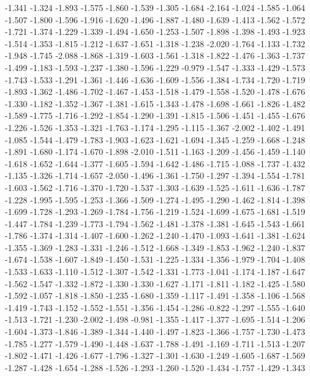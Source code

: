 \documentclass[9pt]{article}
\theoremstyle{plain}
\theoremstyle{definition}
\theoremstyle{remark}
\numberwithin{equation}{section}
\begin{document}
-1.341
-1.324
-1.893
-1.575
-1.860
-1.539
-1.305
-1.684
-2.164
-1.024
-1.585
-1.064
-1.507
-1.800
-1.596
-1.916
-1.620
-1.496
-1.887
-1.480
-1.639
-1.413
-1.562
-1.572
-1.721
-1.374
-1.229
-1.339
-1.494
-1.650
-1.253
-1.507
-1.898
-1.398
-1.493
-1.923
-1.514
-1.353
-1.815
-1.212
-1.637
-1.651
-1.318
-1.238
-2.020
-1.764
-1.133
-1.732
-1.948
-1.745
-2.088
-1.868
-1.319
-1.603
-1.561
-1.318
-1.822
-1.476
-1.363
-1.737
-1.499
-1.183
-1.593
-1.237
-1.380
-1.596
-1.229
-0.979
-1.547
-1.333
-1.429
-1.573
-1.743
-1.533
-1.291
-1.361
-1.446
-1.636
-1.609
-1.556
-1.384
-1.734
-1.720
-1.719
-1.893
-1.362
-1.486
-1.702
-1.467
-1.453
-1.518
-1.479
-1.558
-1.520
-1.478
-1.676
-1.330
-1.182
-1.352
-1.367
-1.381
-1.615
-1.343
-1.478
-1.698
-1.661
-1.826
-1.482
-1.589
-1.775
-1.716
-1.292
-1.854
-1.290
-1.391
-1.815
-1.506
-1.451
-1.455
-1.676
-1.226
-1.526
-1.353
-1.321
-1.763
-1.174
-1.295
-1.115
-1.367
-2.002
-1.402
-1.491
-1.085
-1.544
-1.479
-1.783
-1.903
-1.623
-1.621
-1.694
-1.345
-1.259
-1.668
-1.248
-1.891
-1.680
-1.174
-1.670
-1.898
-2.010
-1.511
-1.163
-1.209
-1.456
-1.459
-1.140
-1.618
-1.652
-1.644
-1.377
-1.605
-1.594
-1.642
-1.486
-1.715
-1.088
-1.737
-1.432
-1.135
-1.326
-1.714
-1.657
-2.050
-1.496
-1.361
-1.750
-1.297
-1.394
-1.554
-1.781
-1.603
-1.562
-1.716
-1.370
-1.720
-1.537
-1.303
-1.639
-1.525
-1.611
-1.636
-1.787
-1.228
-1.995
-1.595
-1.253
-1.366
-1.509
-1.274
-1.495
-1.290
-1.462
-1.814
-1.398
-1.699
-1.728
-1.293
-1.269
-1.784
-1.756
-1.219
-1.524
-1.699
-1.675
-1.681
-1.519
-1.447
-1.784
-1.239
-1.773
-1.794
-1.562
-1.481
-1.378
-1.381
-1.645
-1.543
-1.661
-1.786
-1.374
-1.314
-1.407
-1.600
-1.262
-1.240
-1.470
-1.093
-1.641
-1.381
-1.624
-1.355
-1.369
-1.283
-1.331
-1.246
-1.512
-1.668
-1.349
-1.853
-1.962
-1.240
-1.837
-1.674
-1.538
-1.607
-1.849
-1.450
-1.531
-1.225
-1.334
-1.356
-1.979
-1.704
-1.408
-1.533
-1.633
-1.110
-1.512
-1.307
-1.542
-1.331
-1.773
-1.041
-1.174
-1.187
-1.647
-1.562
-1.547
-1.332
-1.872
-1.330
-1.330
-1.627
-1.171
-1.811
-1.182
-1.425
-1.580
-1.592
-1.057
-1.818
-1.850
-1.235
-1.680
-1.359
-1.117
-1.491
-1.358
-1.106
-1.568
-1.419
-1.743
-1.152
-1.552
-1.551
-1.356
-1.454
-1.286
-0.822
-1.297
-1.555
-1.640
-1.513
-1.721
-1.230
-2.002
-1.498
-0.981
-1.355
-1.417
-1.377
-1.695
-1.514
-1.206
-1.604
-1.373
-1.846
-1.389
-1.344
-1.440
-1.497
-1.823
-1.366
-1.757
-1.730
-1.473
-1.785
-1.277
-1.579
-1.490
-1.448
-1.637
-1.788
-1.491
-1.169
-1.711
-1.513
-1.207
-1.802
-1.471
-1.426
-1.677
-1.796
-1.327
-1.301
-1.630
-1.249
-1.605
-1.687
-1.569
-1.287
-1.428
-1.654
-1.288
-1.526
-1.293
-1.260
-1.520
-1.434
-1.757
-1.429
-1.343
\end{document}
